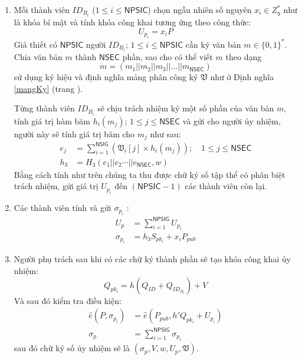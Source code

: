 \begin{enumerate}[label=(\arabic*)]
	\item Mỗi thành viên $ID_{B_i}$ ($1\leqslant i\leqslant \mathsf{NPSIC}$) chọn ngẫu nhiên số nguyên $x_i\in Z_q^*$ như là khóa bí mật và tính khóa công khai tương ứng theo công thức: 
	\begin{equation}
	U_{p_i}=x_iP
	\end{equation}
	Giả thiết có $\mathsf{NPSIC}$ người $ID_{B_i}$; $1\leqslant i\leqslant \mathsf{NPSIC}$ cần ký văn bản $m \in  \{0,1\}^*$. Chia văn bản $m$ thành $\mathsf{NSEC}$ phần, sao cho có thể viết $m$ theo dạng \[ m= (m_1|| m_2|| m_3 || \dots || m_\mathsf{NSEC} ) \] sử dụng ký hiệu và định nghĩa mảng phân công ký $\mathfrak{V}$ như ở Định nghĩa \ref{mangKy} (trang \pageref{mangKy}).
	
	Từng thành viên $ID_{B_i}$ sẽ chịu trách nhiệm ký một số phần của văn bản $m$, tính giá trị hàm băm $h_i(m_j)$; $1\leqslant j\leqslant \mathsf{NSEC}$ và gửi cho người ủy nhiệm, người này sẽ tính giá trị băm cho $m_j$ như sau:
	\begin{align}
	e_j &=\sum_{i=1}^{\mathsf{NSIG}} \left(\mathfrak{V}_i[j] \times h_i(m_j)\right); \quad 1\leqslant j\leqslant \mathsf{NSEC} \\
	h_3 &=H_3(e_1||e_2\cdots ||e_\mathsf{NSEC},w)
	\end{align}	
	Bằng cách tính như trên chúng ta thu được chữ ký số tập thể có phân biệt trách nhiệm, gửi giá trị $U_{p_i}$ đến $(\mathsf{NPSIC}-1)$ các thành viên còn lại.
	\item Các thành viên tính và gửi $ \sigma_{p_i} $ :
	\begin{align*}
	U_p &=\sum_{i=1}^{\mathsf{NPSIG}}U_{p_i} \\
	\sigma_{p_i} &= h_3S_{pk_i} + x_iP_{pub}
	\end{align*}
	\item Người phụ trách sau khi có các chữ ký thành phần sẽ tạo khóa công khai ủy nhiệm:
	\begin{equation}
	Q_{pk_i} = h\left(Q_{ID} + Q_{ID_{B_i}} \right)  + V
	\end{equation}
	Và sau đó kiểm tra điều kiện:
	\begin{align}
	\hat{e}(P,\sigma_{p_i}) &= \hat{e}(P_{pub},h'Q_{pk_i} + U_{p_i}) \\
	\sigma_p &=\sum_{i=1}^{\mathsf{NPSIG}}\sigma_{p_i}
	\end{align}
	sau đó chữ ký số ủy nhiệm sẽ là $(\sigma_p,V,w,U_p,\mathfrak{V})$.
\end{enumerate}

